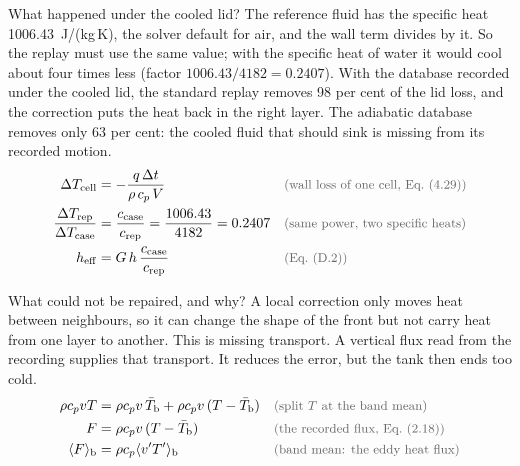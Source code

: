 \begin{qabox}{What happened under the cooled lid?}
\explain The reference fluid has the specific heat 1006.43~J/(kg\,K), the solver default for air,
and the wall term divides by it. So the replay must use the same value; with the specific heat of
water it would cool about four times less (factor $1006.43/4182=0.2407$). With the database recorded
under the cooled lid, the standard replay removes 98 per cent of the lid loss, and the correction
puts the heat back in the right layer. The adiabatic database removes only 63 per cent: the cooled
fluid that should sink is missing from its recorded motion.
\derive
\begin{align*}
\Delta T_{\mathrm{cell}} &= -\frac{q\,\Delta t}{\rho\,c_p\,V} \why{wall loss of one cell, Eq.~(4.29)} \\
\frac{\Delta T_{\mathrm{rep}}}{\Delta T_{\mathrm{case}}} &= \frac{c_{\mathrm{case}}}{c_{\mathrm{rep}}} = \frac{1006.43}{4182} = 0.2407 \why{same power, two specific heats} \\
h_{\mathrm{eff}} &= G\,h\,\frac{c_{\mathrm{case}}}{c_{\mathrm{rep}}} \why{Eq.~(D.2)}
\end{align*}
\end{qabox}

\begin{qabox}{What could not be repaired, and why?}
\explain A local correction only moves heat between neighbours, so it can change the shape of the
front but not carry heat from one layer to another. This is missing transport. A vertical flux read
from the recording supplies that transport. It reduces the error, but the tank then ends too cold.
\derive
\begin{align*}
\rho c_p v T &= \rho c_p v\,\bar{T}_{\mathrm{b}} + \rho c_p v\,(T - \bar{T}_{\mathrm{b}}) \why{split $T$ at the band mean} \\
F &= \rho c_p v\,(T - \bar{T}_{\mathrm{b}}) \why{the recorded flux, Eq.~(2.18)} \\
\langle F\rangle_{\mathrm{b}} &= \rho c_p \langle v' T'\rangle_{\mathrm{b}} \why{band mean: the eddy heat flux}
\end{align*}
\end{qabox}


